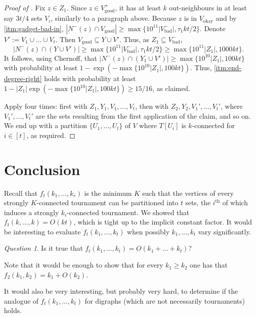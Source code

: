 \documentclass[english]{article}
\theoremstyle{plain}
\theoremstyle{remark}
\newtheorem{question}[theorem]{Question}
\def \Nm {N^-}
\def \Vgp {V_{\good}^+}
\def \Vbm {V_{\bad}^-}
\def \Vgp {V_{\good}^+}
\def \Vo {V_{\okay}}
\def \Vg {V_{\good}}
\def \Nm {N^-}
\DeclareMathOperator{\bad}{bad}
\DeclareMathOperator{\good}{good}
\DeclareMathOperator{\okay}{okay}
\begin{document}
\begin{proof}[Proof of ]
		Fix $z \in Z_1$. Since $z \in \Vgp$, it has at least $k$ out-neighbours in at least say $3t/4$ sets $V_i$, similarly to a paragraph above.
		Because $z$ is in $\Vo$ and by \ref{itm:gadget-bad-in}, $|\Nm(z) \cap \Vg| \ge \max\{10^{11}|\Vbm|, \tau_1 kt/2\}$. 
		Denote $V' := V_1 \cup \ldots \cup V_t$. Then $\Vg \subseteq Y \cup V'$. Thus, as $Z_1 \subseteq \Vbm$,
		\begin{equation*}
			\big|\Nm(z) \cap (Y \cup V')\big| 
			\ge \max\{10^{11}|\Vbm|, \tau_1 kt/2\}
			\ge \max\{10^{11} |Z_1|, 1000kt\}.
		\end{equation*}
		It follows, using Chernoff, that $\big|\Nm(z) \cap (Y_1 \cup V')\big| \ge \max\{10^{10}|Z_1|, 100kt\}$ with probability at least $1 - \exp(-\max\{10^{10}|Z_1|, 100kt\})$. Thus, \ref{itm:end-degree-right} holds with probability at least $1 - |Z_1|\exp(-\max\{10^{10}|Z_1|, 100kt\}) \ge 15/16$, as claimed.

		Apply  four times: first with $Z_1, Y_1, V_1, \ldots, V_{t}$, then with $Z_2, Y_2, V_1', \ldots, V_{t}'$, where $V_1', \ldots, V_{t}'$ are the sets resulting from the first application of the claim, and so on. We end up with a partition $\{U_1, \ldots, U_{t}\}$ of $V$ where $T[U_i]$ is $k$-connected for $i \in [t]$, as required.
	\end{proof}




\section{Conclusion} \label{sec:conclusion}

	Recall that $f_t(k_1, \ldots, k_r)$ is the minimum $K$ such that the vertices of every strongly $K$-connected tournament can be partitioned into $t$ sets, the $i^{\text{th}}$ of which induces a strongly $k_i$-connected tournament. We showed that $f_t(k, \ldots, k) = O(kt)$, which is tight up to the implicit constant factor. It would be interesting to evaluate $f_t(k_1, \ldots, k_t)$ when possibly $k_1, \ldots, k_t$ vary significantly. 

	\begin{question}
		Is it true that $f_t(k_1, \ldots, k_t) = O(k_1 + \ldots + k_t)$?
	\end{question}
    Note that it would be enough to show that for every  $k_1\geq k_2$ one has that $f_2(k_1,k_2)=k_1+O(k_2)$.
    
	It would also be very interesting, but probably very hard, to determine if the analogue of $f_t(k_1, \ldots, k_t)$ for digraphs (which are not necessarily tournaments) holds. 
\end{document}
